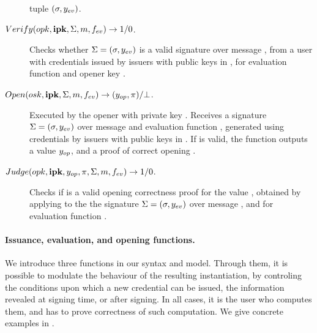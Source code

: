 \begin{description}
  tuple $(\sigma,y_{ev})$.
\item[$Verify(opk,\mathbf{ipk},\Sigma,m,f_{ev}) \rightarrow 1/0$.]
  Checks whether $\Sigma = (\sigma,y_{ev})$ is a valid signature
  over message \msg, from a user with credentials issued by issuers with public
  keys in \sipk, for evaluation function \feval and opener key \opk.
\item[$Open(osk,\mathbf{ipk},\Sigma,m,f_{ev}) \rightarrow
  (y_{op},\pi)/\bot$.]
  Executed by the opener with private key \osk. Receives a signature $\Sigma=
  (\sigma,y_{ev})$ over message \msg and evaluation function \feval,
  generated using credentials by issuers with public keys in \sipk.
  If \Sig is valid, the function outputs a value $y_{op}$, and a proof of
  correct opening \iproof.
\item[$Judge(opk,\mathbf{ipk},y_{op},\pi,\Sigma,m,f_{ev}) \rightarrow 1/0$.] %
  Checks if \iproof is a valid opening correctness proof for the value \yinsp,
  obtained by applying \Open to the the signature $\Sigma = (\sigma,y_{ev})$
  over message \msg, and for evaluation function \feval. 
\end{description}

\paragraph{Issuance, evaluation, and opening functions.} %
We introduce three functions in our syntax and model. Through them,
it is possible to modulate the behaviour of the resulting instantiation, by
controling the conditions upon which a new credential can be issued, the
information revealed at signing time, or after signing. In all cases, it is
the user who computes them, and has to prove correctness of such computation.
We give concrete examples in .

